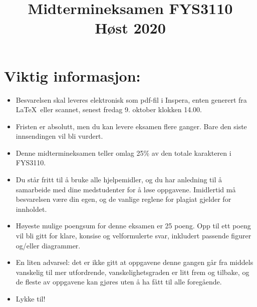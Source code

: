 \documentclass[11pt,a4paper]{report}
\title{Midtermineksamen FYS3110\\ Høst 2020}
\author{}
\begin{document}
\maketitle

\addtocounter{page}{1}

\section*{Viktig informasjon:}
\begin{itemize}
\item
Besvarelsen skal leveres elektronisk som pdf-fil i Inspera, enten generert fra \LaTeX\  eller scannet, senest fredag 9. oktober klokken  14.00.
\item
Fristen er absolutt, men du kan levere eksamen flere ganger. Bare den siste innsendingen vil bli vurdert.
\item
Denne midtermineksamen teller omlag 25\% av den totale karakteren i FYS3110.
\item
Du står fritt til å bruke alle hjelpemidler, og du har anledning til å samarbeide med dine medstudenter for å løse oppgavene. Imidlertid må besvarelsen være din egen, og de vanlige reglene for plagiat gjelder for innholdet.
\item
Høyeste mulige poengsum for denne eksamen er 25 poeng. Opp til ett poeng vil bli gitt for klare, konsise og velformulerte svar, inkludert passende figurer og/eller diagrammer.
\item
En liten advarsel: det er ikke gitt at oppgavene denne gangen går fra middels vanskelig til mer utfordrende, vanskelighetsgraden er litt frem og tilbake, og de fleste av oppgavene kan gjøres uten å ha fått til alle foregående.
\item
Lykke til!
\end{itemize}

\cleardoublepage
\end{document}
